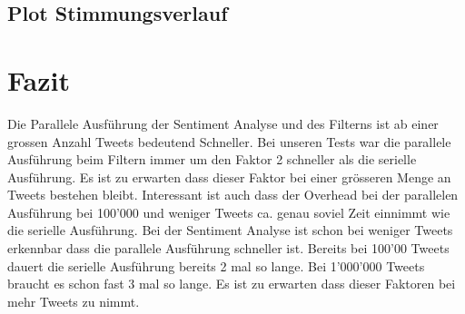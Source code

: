 \documentclass[12pt, oneside]{report}   	%
\begin{document}
\section{Plot Stimmungsverlauf}


\chapter{Fazit}
Die Parallele Ausführung der Sentiment Analyse und des Filterns ist ab einer grossen Anzahl Tweets bedeutend Schneller. Bei unseren Tests war die parallele Ausführung beim Filtern immer um den Faktor 2 schneller als die serielle Ausführung. Es ist zu erwarten dass dieser Faktor bei einer grösseren Menge an Tweets bestehen bleibt. Interessant ist auch dass der Overhead bei der parallelen Ausführung bei 100'000 und weniger Tweets ca. genau soviel Zeit einnimmt wie die serielle Ausführung. \newline{}
Bei der Sentiment Analyse ist schon bei weniger Tweets erkennbar dass die parallele Ausführung schneller ist. Bereits bei 100'00 Tweets dauert die serielle Ausführung bereits 2 mal so lange. Bei 1'000'000 Tweets braucht es schon fast 3 mal so lange. Es ist zu erwarten dass dieser Faktoren bei mehr Tweets zu nimmt.


\end{document}
